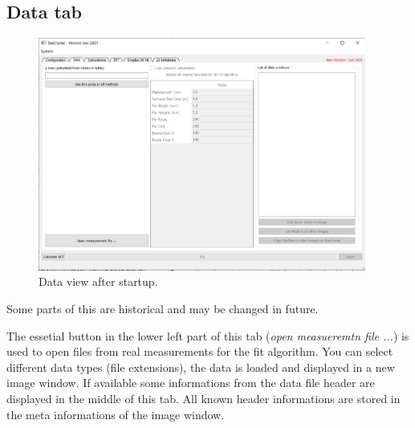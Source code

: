 \documentclass[11pt]{article} %
\begin{document}
\subsection{Data tab}

\begin{figure}[H]
 \centering
 \includegraphics[width=0.96\textwidth]{main-data-start.png}
 \caption{Data view after startup.}
 \label{fig:datastart}
\end{figure}
Some parts of this are historical and may be changed in future.

The essetial button in the lower left part of this tab ({\it open measueremtn file ...}) is used to open files from real measurements for the fit algorithm. You can select different data types (file extensions), the data is loaded and displayed in a new image window. If available some informations from the data file header are displayed in the middle of this tab. All known header informations are stored in the meta informations of the image window.
\end{document}
